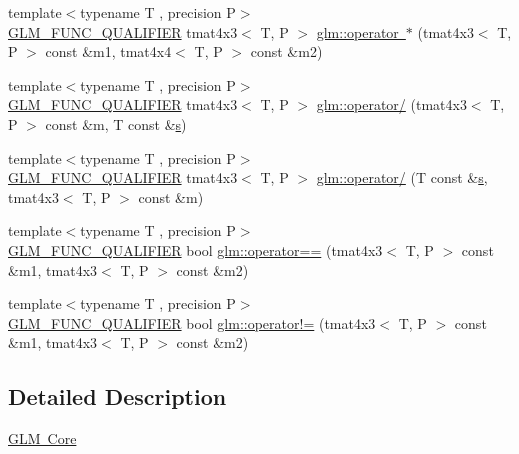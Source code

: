 \begin{DoxyCompactItemize}
\item 
{\footnotesize template$<$typename T , precision P$>$ }\\\mbox{\hyperlink{setup_8hpp_a33fdea6f91c5f834105f7415e2a64407}{G\+L\+M\+\_\+\+F\+U\+N\+C\+\_\+\+Q\+U\+A\+L\+I\+F\+I\+ER}} tmat4x3$<$ T, P $>$ \mbox{\hyperlink{namespaceglm_abfc61d4f3b751a082e0894aee7e3e812}{glm\+::operator $\ast$}} (tmat4x3$<$ T, P $>$ const \&m1, tmat4x4$<$ T, P $>$ const \&m2)
\item 
{\footnotesize template$<$typename T , precision P$>$ }\\\mbox{\hyperlink{setup_8hpp_a33fdea6f91c5f834105f7415e2a64407}{G\+L\+M\+\_\+\+F\+U\+N\+C\+\_\+\+Q\+U\+A\+L\+I\+F\+I\+ER}} tmat4x3$<$ T, P $>$ \mbox{\hyperlink{namespaceglm_ae7004574df6323d999b0a1be72ac72d6}{glm\+::operator/}} (tmat4x3$<$ T, P $>$ const \&m, T const \&\mbox{\hyperlink{glad_8h_af1b1d5edfea6a34daee7389b1b5810ad}{s}})
\item 
{\footnotesize template$<$typename T , precision P$>$ }\\\mbox{\hyperlink{setup_8hpp_a33fdea6f91c5f834105f7415e2a64407}{G\+L\+M\+\_\+\+F\+U\+N\+C\+\_\+\+Q\+U\+A\+L\+I\+F\+I\+ER}} tmat4x3$<$ T, P $>$ \mbox{\hyperlink{namespaceglm_ad3cad8f5fbca99608719dbab6c2c3537}{glm\+::operator/}} (T const \&\mbox{\hyperlink{glad_8h_af1b1d5edfea6a34daee7389b1b5810ad}{s}}, tmat4x3$<$ T, P $>$ const \&m)
\item 
{\footnotesize template$<$typename T , precision P$>$ }\\\mbox{\hyperlink{setup_8hpp_a33fdea6f91c5f834105f7415e2a64407}{G\+L\+M\+\_\+\+F\+U\+N\+C\+\_\+\+Q\+U\+A\+L\+I\+F\+I\+ER}} bool \mbox{\hyperlink{namespaceglm_a26d8f492037c0d9932f3dcdc1f5ad329}{glm\+::operator==}} (tmat4x3$<$ T, P $>$ const \&m1, tmat4x3$<$ T, P $>$ const \&m2)
\item 
{\footnotesize template$<$typename T , precision P$>$ }\\\mbox{\hyperlink{setup_8hpp_a33fdea6f91c5f834105f7415e2a64407}{G\+L\+M\+\_\+\+F\+U\+N\+C\+\_\+\+Q\+U\+A\+L\+I\+F\+I\+ER}} bool \mbox{\hyperlink{namespaceglm_ab5df48e5151769b6a258c2c3f2699e9c}{glm\+::operator!=}} (tmat4x3$<$ T, P $>$ const \&m1, tmat4x3$<$ T, P $>$ const \&m2)
\end{DoxyCompactItemize}


\subsection{Detailed Description}
\mbox{\hyperlink{group__core}{G\+LM Core}} 
